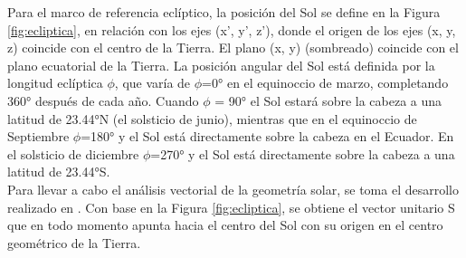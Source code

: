 Para el marco de referencia eclíptico, la posición del Sol se define en la Figura \ref{fig:ecliptica}, en relación con los ejes (x', y', z'), donde el origen de los ejes (x, y, z) coincide con el centro de la Tierra. El plano (x, y) (sombreado) coincide con el plano ecuatorial de la Tierra. La posición angular del Sol está definida por la longitud eclíptica $\phi$, que varía de $\phi$=0° en el equinoccio de marzo, completando 360° después de cada año. Cuando $\phi$ = 90° el Sol estará sobre la cabeza a una latitud de 23.44°N (el solsticio de junio), mientras que en el equinoccio de Septiembre $\phi$=180° y el Sol está directamente sobre la cabeza en el Ecuador. En el solsticio de diciembre $\phi$=270° y el Sol está directamente sobre la cabeza a una latitud de 23.44°S.\\

Para llevar a cabo el análisis vectorial de la geometría solar, se toma el desarrollo realizado en \cite{M10}. Con base en la Figura \ref{fig:ecliptica}, se obtiene el vector unitario S que en todo momento apunta hacia el centro del Sol con su origen en el centro geométrico de la Tierra. 

%
%
%
%
%
%
%

